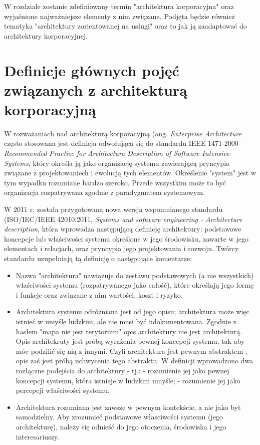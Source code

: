 W rozdziale zostanie zdefiniowany termin "architektura korporacyjna" oraz wyjaśnione najważniejsze elementy z nim związane. Podjęta będzie również tematyka "architektury zorientowanej na usługi" oraz to jak ją zaadaptować do architektury korporacyjnej. 

\section{Definicje głównych pojęć związanych z architekturą korporacyjną}
W rozważaniach nad architekturą korporacyjną (ang. \textit{Enterprise Architecture} często stosowana jest definicja odwołująca się do standardu IEEE 1471-2000 \textit{Recommended Practice for Architectura Description of Software Intensive Systems}, który określa ją jako organizację systemu zawierającą pryncypia związane z projektowaniech i ewolucją tych elementów. Określenie "system" jest w tym wypadku rozumiane bardzo szeroko. Przede wszystkim może to być organizacja rozpatrywana zgodnie z paradygmatem systemowym. 

W 2011 r. została przygotowana nowa wersja wspomnianego standardu (ISO/IEC/IEEE 42010:2011, \textit{Systems and software engineering - Architecture description}, która wprowadza następującą definicję architektury: podstawowe koncepcje lub właściwości systemu określone w jego środowisku, zawarte w jego elementach i relacjach, oraz pryncypia jego projektowania i rozwoju. Twórcy standardu uzupełniają tą definicję o następujące komentarze: 
\begin{itemize}
\item{Nazwa "architektura" nawiązuje do zestawu podstawowych (a nie wszystkich) właściwości systemu (rozpatrywanego jako całość), które określają jego formę i funkcje oraz związane z nim wartości, koszt i ryzyko.}
\item{Architektura systemu odróżniana jest od jego opisu; architektura może więc istnieć w umyśle ludzkim, ale nie musi być udokumentowana. Zgodnie z hasłem "mapa nie jest terytorium" opis architektury nie jest architekturą. Opis architekruty jest próbą wyrażenia pewnej koncepcji systemu, tak aby móc podzilić się nią z innymi. Czyli architektura jest pewnym abstraktem , opis zaś jest próbą uchwycenia tego abstraktu.
W definicji wprowadzono dwa rozłączne podejścia do architektury - tj.:
- rozumienie jej jako pewnej koncepcji systemu, która istnieje w ludzkim umyśle;
- rozumienie jej jako percepcji właściwości systemu.}
\item{Architektura rozumiana jest zawsze w pewnym kontekście, a nie jako byt samodzielny. Aby zrozumieć podstawowe własciwości systemu (jego architekturę), należy się odnieść do jego otoczenia, środowiska i jego interesariuszy.}
\end{itemize}

